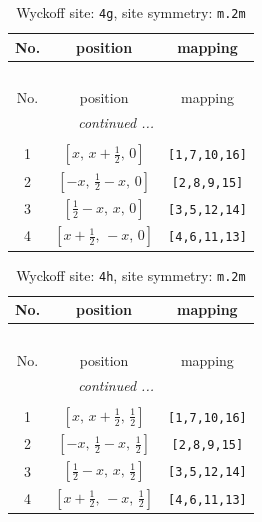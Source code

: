 \documentclass[fleqn,8pt]{jsarticle}
\begin{document}
\renewcommand{\arraystretch}{1.2}
\begin{longtable}{ccc}
\caption{Wyckoff site: {\tt 4g}, site symmetry: {\tt m.2m}}
 \\
 \hline \hline
No. & position & mapping \\ \hline \endfirsthead

\multicolumn{2}{l}{\tablename\ \thetable{}} \\
 \hline \hline
No. & position & mapping \\ \hline \endhead

 \hline \hline
\multicolumn{2}{r}{\footnotesize\it continued ...} \\ \endfoot

 \hline \hline
\multicolumn{2}{r}{} \\ \endlastfoot

1 & $\left[ x,\, x + \frac{1}{2},\, 0 \right]$ & {\tt [1,7,10,16]} \\ \hline
2 & $\left[ - x,\, \frac{1}{2} - x,\, 0 \right]$ & {\tt [2,8,9,15]} \\ \hline
3 & $\left[ \frac{1}{2} - x,\, x,\, 0 \right]$ & {\tt [3,5,12,14]} \\ \hline
4 & $\left[ x + \frac{1}{2},\, - x,\, 0 \right]$ & {\tt [4,6,11,13]} \\
\end{longtable}
\renewcommand{\arraystretch}{1.2}
\begin{longtable}{ccc}
\caption{Wyckoff site: {\tt 4h}, site symmetry: {\tt m.2m}}
 \\
 \hline \hline
No. & position & mapping \\ \hline \endfirsthead

\multicolumn{2}{l}{\tablename\ \thetable{}} \\
 \hline \hline
No. & position & mapping \\ \hline \endhead

 \hline \hline
\multicolumn{2}{r}{\footnotesize\it continued ...} \\ \endfoot

 \hline \hline
\multicolumn{2}{r}{} \\ \endlastfoot

1 & $\left[ x,\, x + \frac{1}{2},\, \frac{1}{2} \right]$ & {\tt [1,7,10,16]} \\ \hline
2 & $\left[ - x,\, \frac{1}{2} - x,\, \frac{1}{2} \right]$ & {\tt [2,8,9,15]} \\ \hline
3 & $\left[ \frac{1}{2} - x,\, x,\, \frac{1}{2} \right]$ & {\tt [3,5,12,14]} \\ \hline
4 & $\left[ x + \frac{1}{2},\, - x,\, \frac{1}{2} \right]$ & {\tt [4,6,11,13]} \\
\end{longtable}
\end{document}
